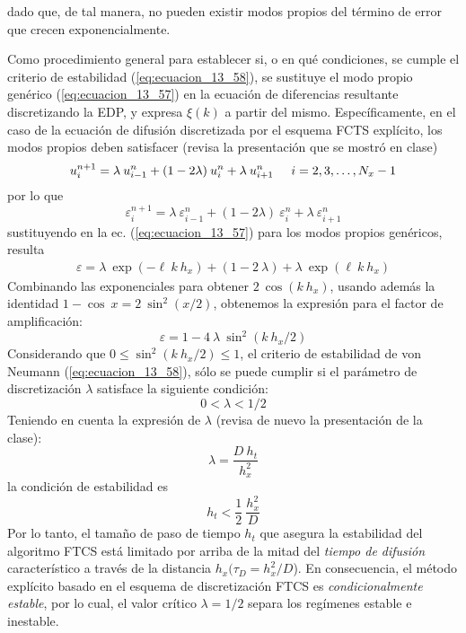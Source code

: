 dado que, de tal manera, no pueden existir modos propios del término de error que crecen exponencialmente.
\par
Como procedimiento general para establecer si, o en qué condiciones, se cumple el criterio de estabilidad (\ref{eq:ecuacion_13_58}), se sustituye el modo propio genérico (\ref{eq:ecuacion_13_57}) en la ecuación de diferencias resultante discretizando la EDP, y expresa $\xi(k)$ a partir del mismo. Específicamente, en el caso de la ecuación de difusión discretizada por el esquema FCTS explícito, los modos propios deben satisfacer (revisa la presentación que se mostró en clase)
\begin{equation}
u_{i}^{n + 1} = \lambda \: u_{i - 1}^{n} + (1 - 2 \lambda) \: u_{i}^{n} + \lambda \: u_{i + 1}^{n} \hspace{0.5cm} i = 2, 3, \ldots, N_{x} -1
\label{eq:ecuacion_13_46}
\end{equation}
por lo que
\begin{equation}
\varepsilon_{i}^{n + 1} = \lambda \: \varepsilon_{i - 1}^{n} + (1 - 2 \lambda) \: \varepsilon_{i}^{n} + \lambda \: \varepsilon_{i + 1}^{n}
\label{eq:ecuacion_13_59}
\end{equation}
sustituyendo en la ec. (\ref{eq:ecuacion_13_57}) para los modos propios genéricos, resulta
\begin{align*}
\varepsilon = \lambda \: \exp (- \ell \: k \: h_{x}) + (1 - 2 \: \lambda) + \lambda \: \exp(\ell \: k \: h_{x})
\end{align*}
Combinando las exponenciales para obtener $2 \: \cos (k \: h_{x})$, usando además la identidad $1 - \cos \: x =  2 \: \sin^{2} (x/2)$, obtenemos la expresión para el factor de amplificación:
\begin{equation}
\varepsilon = 1 - 4 \: \lambda \:  \sin^{2} (k \: h_{x} / 2)
\label{eq:ecuacion_13_60}
\end{equation}
Considerando que $0 \leq \sin^{2}(k \: h_{x} / 2) \leq 1$, el criterio de estabilidad de von Neumann (\ref{eq:ecuacion_13_58}), sólo se puede cumplir si el parámetro de discretización $\lambda$ satisface la siguiente condición:
\begin{equation}
0 < \lambda < 1/2
\label{eq:ecuacion_13_61}
\end{equation}
Teniendo en cuenta la expresión de $\lambda$ (revisa de nuevo la presentación de la clase):
\begin{equation}
\lambda =  \dfrac{D \: h_{t}}{h_{x}^{2}}
\label{eq:ecuacion_13_47}
\end{equation}
la condición de estabilidad es
\begin{equation}
h_{t} < \dfrac{1}{2} \: \dfrac{h_{x}^{2}}{D}
\label{eq:ecuacion_13_62}
\end{equation}
Por lo tanto, el tamaño de paso de tiempo $h_{t}$ que asegura la estabilidad del algoritmo FTCS está limitado por arriba de la mitad del \emph{tiempo de difusión} característico a través de la distancia $h_{x} (\tau_{D}^{} = h_{x}^{2} / D$).
En consecuencia, el método explícito basado en el esquema de discretización FTCS es \emph{condicionalmente estable}, por lo cual, el valor crítico $\lambda = 1/2$ separa los regímenes estable e inestable.
\newpage
